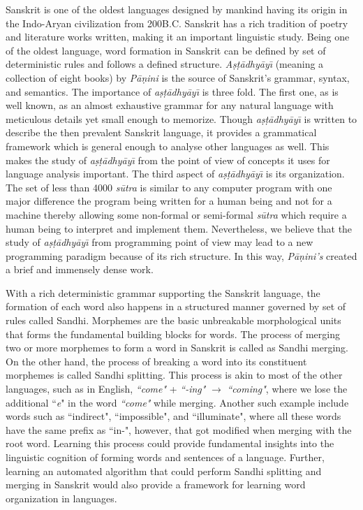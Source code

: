 \documentclass[11pt]{article}
\begin{document}
Sanskrit is one of the oldest languages designed by mankind having its origin in the Indo-Aryan civilization from 200B.C. Sanskrit has a rich tradition of poetry and literature works written, making it an important linguistic study. Being one of the oldest language, word formation in Sanskrit can be defined by set of deterministic rules and follows a defined structure. \textit{A\d{s}\d{t}\={a}dhy\={a}y\={\i}} (meaning a collection of eight books) by \textit{P\={a}\d{n}ini} is the source of Sanskrit's grammar, syntax, and semantics. The importance of \textit{a\d{s}\d{t}\={a}dhy\={a}y\={\i}} is three fold. The first one, as is well known, as an almost exhaustive grammar for any natural language with meticulous details yet small enough to memorize. Though \textit{a\d{s}\d{t}\={a}dhy\={a}y\={\i}} is written to describe the then prevalent Sanskrit language, it provides a grammatical framework which is general enough to analyse other languages as well. This makes the study of \textit{a\d{s}\d{t}\={a}dhy\={a}y\={\i}} from the point of view of concepts it uses for language analysis important. The third aspect of \textit{a\d{s}\d{t}\={a}dhy\={a}y\={\i}} is its organization. The set of less than 4000 \textit{s\={u}tra} is similar to any computer program with one major difference the program being written for a human being and not for a machine thereby allowing some non-formal or semi-formal \textit{s\={u}tra} which require a human being to interpret and implement them. Nevertheless, we believe that the study of \textit{a\d{s}\d{t}\={a}dhy\={a}y\={\i}} from programming point of view may lead to a new programming paradigm because of its rich structure. In this way, 	\textit{P\={a}\d{n}ini's} created a brief and immensely dense work. 

With a rich deterministic grammar supporting the Sanskrit language, the formation of each word also happens in a structured manner governed by set of rules called Sandhi. Morphemes are the basic unbreakable morphological units that forms the fundamental building blocks for words. The process of merging two or more morphemes to form a word in Sanskrit is called as Sandhi merging. On the other hand, the process of breaking a word into its constituent morphemes is called Sandhi splitting. This process is akin to most of the other languages, such as in English, \textit{``come"} + \textit{``-ing"} $\rightarrow$ \textit{``coming"}, where we lose the additional ``\textit{e}" in the word \textit{``come"} while merging. Another such example include words such as ``indirect", ``impossible", and ``illuminate", where all these words have the same prefix as ``in-", however, that got modified when merging with the root word. Learning this process could provide fundamental insights into the linguistic cognition of forming words and sentences of a language. Further, learning an automated algorithm that could perform Sandhi splitting and merging in Sanskrit would also provide a framework for learning word organization in languages.
\end{document}
